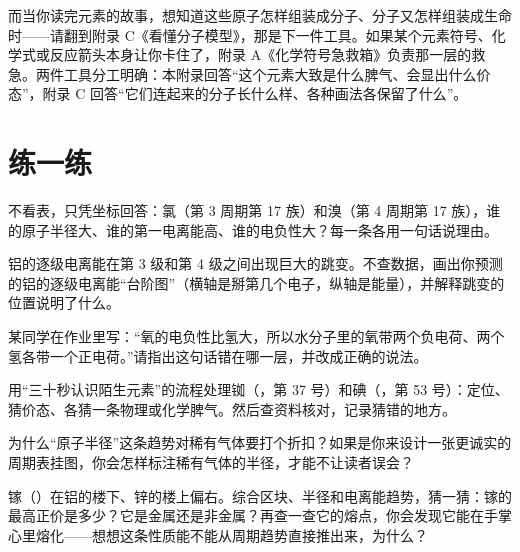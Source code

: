 而当你读完元素的故事，想知道这些原子怎样组装成分子、分子又怎样组装成生命时——请翻到附录 C《看懂分子模型》，那是下一件工具。如果某个元素符号、化学式或反应箭头本身让你卡住了，附录 A《化学符号急救箱》负责那一层的救急。两件工具分工明确：本附录回答“这个元素大致是什么脾气、会显出什么价态”，附录 C 回答“它们连起来的分子长什么样、各种画法各保留了什么”。

\section*{练一练}

\begin{sikaoti}
\item 不看表，只凭坐标回答：氯（第 3 周期第 17 族）和溴（第 4 周期第 17 族），谁的原子半径大、谁的第一电离能高、谁的电负性大？每一条各用一句话说理由。
\item 铝的逐级电离能在第 3 级和第 4 级之间出现巨大的跳变。不查数据，画出你预测的铝的逐级电离能“台阶图”（横轴是掰第几个电子，纵轴是能量），并解释跳变的位置说明了什么。
\item 某同学在作业里写：“氧的电负性比氢大，所以水分子里的氧带两个负电荷、两个氢各带一个正电荷。”请指出这句话错在哪一层，并改成正确的说法。
\item 用“三十秒认识陌生元素”的流程处理铷（，第 37 号）和碘（，第 53 号）：定位、猜价态、各猜一条物理或化学脾气。然后查资料核对，记录猜错的地方。
\item 为什么“原子半径”这条趋势对稀有气体要打个折扣？如果是你来设计一张更诚实的周期表挂图，你会怎样标注稀有气体的半径，才能不让读者误会？
\item 镓（）在铝的楼下、锌的楼上偏右。综合区块、半径和电离能趋势，猜一猜：镓的最高正价是多少？它是金属还是非金属？再查一查它的熔点，你会发现它能在手掌心里熔化——想想这条性质能不能从周期趋势直接推出来，为什么？
\end{sikaoti}
